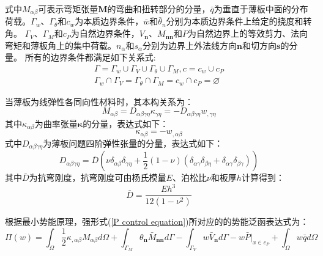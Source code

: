式中$M_{\alpha\beta}$可表示弯矩张量$\boldsymbol M$的弯曲和扭转部分的分量，$\bar q$为垂直于薄板中面的分布荷载。$\Gamma_w$、$\Gamma_{\theta}$和$c_w$为本质边界条件，$\bar w$和$\bar \theta_n$分别为本质边界条件上给定的挠度和转角。
$\Gamma_V$、$\Gamma_M$和$c_P$为自然边界条件，$V_{\boldsymbol n}$、$M_{\boldsymbol{nn}}$和$P$为自然边界上的等效剪力、法向弯矩和薄板角上的集中荷载。$n_\alpha$和$s_\alpha$分别为边界上外法线方向$\pmb{n}$和切方向$\pmb{s}$的分量。
所有的边界条件都满足如下关系式:
\begin{equation}\label{PGeometric relationships}
    \begin{split}
        \Gamma=\Gamma_w\cup\Gamma_V\cup\Gamma_{\theta}\cup\Gamma_M,c=c_w\cup c_P\\
        \Gamma_w\cap\Gamma_V=\Gamma_{\theta}\cap\Gamma_M=c_w\cap c_P=\varnothing
    \end{split}
\end{equation}\par
当薄板为线弹性各同向性材料时，其本构关系为：
\begin{equation}\label{Malphabeta}
    M_{\alpha\beta}=D_{\alpha\beta\gamma\eta}\kappa_{\gamma\eta}=-D_{\alpha\beta\gamma\eta}w_{,\gamma\eta}
\end{equation}
其中$\kappa_{\alpha\beta}$为曲率张量$\pmb{\kappa}$的分量，表达式如下：
\begin{equation}\label{kappa}
    \kappa_{\alpha\beta}=-w_{,\alpha\beta}
\end{equation}
式中$D_{\alpha \beta \gamma \eta}$为薄板问题四阶弹性张量的分量，表达式如下：
\begin{equation}\label{Dalphabeta}
        D_{\alpha\beta\gamma\eta}=\bar D(\nu\delta_{\alpha\beta}\delta_{\gamma\eta}+\frac{1}{2}(1-\nu)(\delta_{\alpha\gamma}\delta_{\beta\eta}+\delta_{\alpha\gamma}\delta_{\beta\gamma}))
\end{equation}
其中$\bar{D}$为抗弯刚度，抗弯刚度可由杨氏模量$E$、泊松比$\nu$和板厚$h$计算得到：
\begin{equation}\label{kangwangangdu}
    \bar D=\frac{Eh^3}{12(1-\nu^2)}
\end{equation}
\par
根据最小势能原理，强形式(\ref{P control equation})所对应的的势能泛函表达式为：
\begin{equation}\label{Pshineng}
    \Pi(w)=\int_{\Omega}\frac{1}{2}\kappa_{,\alpha\beta}M_{\alpha\beta}d\Omega+\int_{\Gamma_M}\theta_{\pmb{n}}\bar{M}_{\pmb{nn}}d\Gamma
    -\int_{\Gamma_V}w\bar{V}_{\pmb{n}}d\Gamma-w\bar{P}\vert_{x\in c_P}+\int_{\Omega}w\bar{q}d\Omega
\end{equation}
